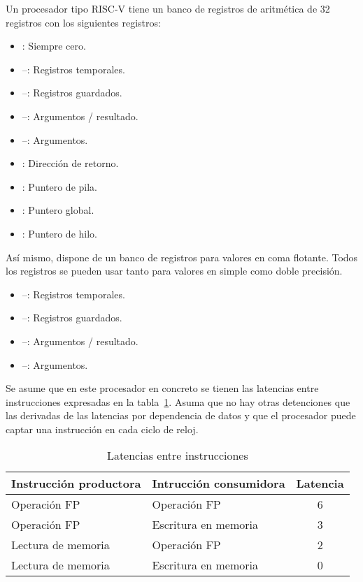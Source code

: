 \begin{acexercise}\end{acexercise}

Un procesador tipo RISC-V tiene un banco de registros de aritmética de 32 registros con los siguientes
registros:

\begin{itemize}
  \item {}: Siempre cero.
  \item {}--: Registros temporales.
  \item {}--: Registros guardados.
  \item {}--: Argumentos / resultado.
  \item {}--: Argumentos.
  \item {}: Dirección de retorno.
  \item {}: Puntero de pila.
  \item {}: Puntero global.
  \item {}: Puntero de hilo.
\end{itemize}

Así mismo, dispone de un banco de registros para valores en coma flotante. Todos los registros
se pueden usar tanto para valores en simple como doble precisión.

\begin{itemize}
  \item {}--: Registros temporales.
  \item {}--: Registros guardados.
  \item {}--: Argumentos / resultado.
  \item {}--: Argumentos.
\end{itemize}

Se asume que en este procesador en concreto se tienen las latencias entre instrucciones
expresadas en la tabla~\ref{tab:unroll-1:latencies}. Asuma que no hay otras detenciones
que las derivadas de las latencias por dependencia de datos y que el procesador puede
captar una instrucción en cada ciclo de reloj.

\begin{table}[htb]
\begin{tabular}{|l|l|c|}
\hline
\textbf{Instrucción productora} &
\textbf{Intrucción consumidora} &
\textbf{Latencia}
\\
\hline

Operación FP & Operación FP & 6\\
\hline

Operación FP & Escritura en memoria & 3\\
\hline

Lectura de memoria & Operación FP & 2\\
\hline

Lectura de memoria & Escritura en memoria & 0\\
\hline

\end{tabular}
\caption{Latencias entre instrucciones}
\label{tab:unroll-1:latencies}
\end{table}

